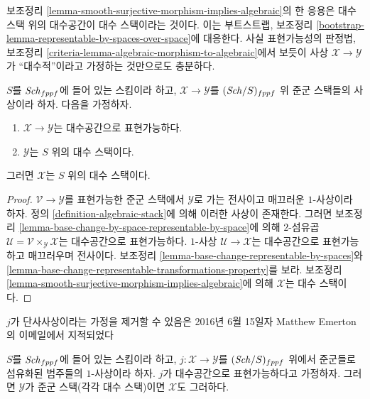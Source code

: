 \noindent
보조정리 \ref{lemma-smooth-surjective-morphism-implies-algebraic}의 한
응용은 대수 스택 위의 대수공간이 대수 스택이라는 것이다. 이는
부트스트랩, 보조정리
\ref{bootstrap-lemma-representable-by-spaces-over-space}에 대응한다.
사실 표현가능성의 판정법, 보조정리
\ref{criteria-lemma-algebraic-morphism-to-algebraic}에서 보듯이 사상
$\mathcal{X} \to \mathcal{Y}$가 ``대수적''이라고 가정하는 것만으로도
충분하다.

\begin{lemma}
\label{lemma-representable-morphism-to-algebraic}
$S$를 $\mathit{Sch}_{fppf}$에 들어 있는 스킴이라 하고,
$\mathcal{X} \to \mathcal{Y}$를 $(\mathit{Sch}/S)_{fppf}$ 위 준군 스택들의
사상이라 하자. 다음을 가정하자.
\begin{enumerate}
\item $\mathcal{X} \to \mathcal{Y}$는 대수공간으로 표현가능하다.
\item $\mathcal{Y}$는 $S$ 위의 대수 스택이다.
\end{enumerate}
그러면 $\mathcal{X}$는 $S$ 위의 대수 스택이다.
\end{lemma}

\begin{proof}
$\mathcal{V} \to \mathcal{Y}$를 표현가능한 준군 스택에서
$\mathcal{Y}$로 가는 전사이고 매끄러운 $1$-사상이라 하자. 정의
\ref{definition-algebraic-stack}에 의해 이러한 사상이 존재한다. 그러면
보조정리 \ref{lemma-base-change-by-space-representable-by-space}에 의해
$2$-섬유곱 $\mathcal{U} = \mathcal{V} \times_{\mathcal Y} \mathcal X$는
대수공간으로 표현가능하다. $1$-사상 $\mathcal{U} \to \mathcal X$는
대수공간으로 표현가능하고 매끄러우며 전사이다. 보조정리
\ref{lemma-base-change-representable-by-spaces}와
\ref{lemma-base-change-representable-transformations-property}를 보라.
보조정리 \ref{lemma-smooth-surjective-morphism-implies-algebraic}에 의해
$\mathcal{X}$는 대수 스택이다.
\end{proof}

\begin{lemma}
\label{lemma-open-fibred-category-is-algebraic}
\begin{reference}
$j$가 단사사상이라는 가정을 제거할 수 있음은 2016년 6월 15일자
Matthew Emerton의 이메일에서 지적되었다
\end{reference}
$S$를 $\mathit{Sch}_{fppf}$에 들어 있는 스킴이라 하고,
$j : \mathcal X \to \mathcal Y$를 $(\mathit{Sch}/S)_{fppf}$ 위에서 준군들로
섬유화된 범주들의 $1$-사상이라 하자. $j$가 대수공간으로 표현가능하다고
가정하자. 그러면 $\mathcal{Y}$가 준군 스택(각각 대수 스택)이면
$\mathcal{X}$도 그러하다.
\end{lemma}

